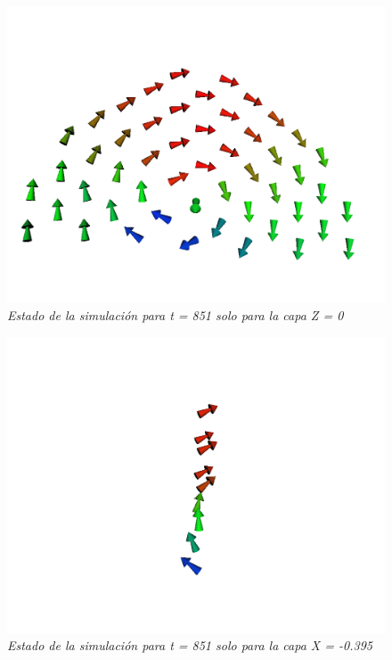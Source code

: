 \begin{figure}[ht]
  \centering
  \includegraphics[scale=.3]{images/softwareVisualizacionVectorsZ}
  \caption{\em Estado de la simulación para t = 851 solo para la capa Z = 0}
  \label{softwareVisualizacionVectorsZ}
\end{figure}


\begin{figure}[ht]
  \centering
  \includegraphics[scale=.3]{images/softwareVisualizacionVectorsX}
  \caption{\em Estado de la simulación para t = 851 solo para la capa X = -0.395}
  \label{softwareVisualizacionVectorsX}
\end{figure}